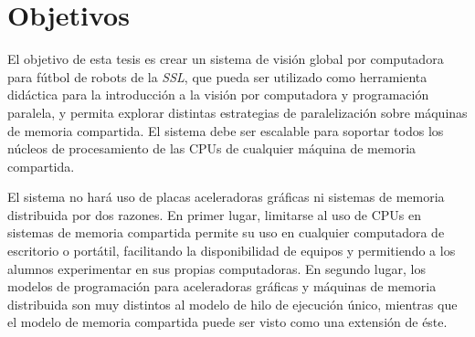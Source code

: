 
\section{Objetivos}

\label{objetivos}

El objetivo de esta tesis es crear un sistema de visión global por computadora
para fútbol de robots de la \emph{SSL}, que pueda ser utilizado como herramienta
didáctica para la introducción a la visión por computadora y programación
paralela, y permita explorar distintas estrategias de paralelización sobre
máquinas de memoria compartida. El sistema debe ser escalable para soportar
todos los núcleos de procesamiento de las CPUs de cualquier máquina de memoria
compartida.

El sistema no hará uso de placas aceleradoras gráficas ni sistemas de memoria distribuida
por dos razones. En primer lugar, limitarse al uso de CPUs en sistemas de
memoria compartida permite su uso en cualquier computadora de escritorio o
portátil, facilitando la disponibilidad de equipos y permitiendo a los alumnos
experimentar en sus propias computadoras. En segundo lugar, los modelos de
programación para aceleradoras gráficas y máquinas de memoria distribuida son
muy distintos al modelo de hilo de ejecución único, mientras que el modelo de
memoria compartida puede ser visto como una extensión de éste.
